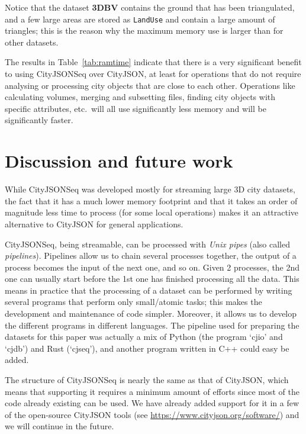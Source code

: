 \documentclass{isprs} %
\begin{document}
Notice that the dataset \textbf{3DBV} contains the ground that has been triangulated, and a few large areas are stored as \texttt{LandUse} and contain a large amount of triangles; this is the reason why the maximum memory use is larger than for other datasets. 

%

The results in Table~\ref{tab:ramtime} indicate that there is a very significant benefit to using CityJSONSeq over CityJSON, at least for operations that do not require analysing or processing city objects that are close to each other.
Operations like calculating volumes, merging and subsetting files, finding city objects with specific attributes, etc.\ will all use significantly less memory and will be significantly faster.


%
\section{Discussion and future work}%
\label{sec:discussion}



While CityJSONSeq was developed mostly for streaming large 3D city datasets, the fact that it has a much lower memory footprint and that it takes an order of magnitude less time to process (for some local operations) makes it an attractive alternative to CityJSON for general applications.

%

CityJSONSeq, being streamable, can be processed with \emph{Unix pipes} (also called \emph{pipelines}).
Pipelines allow us to chain several processes together, the output of a process becomes the input of the next one, and so on. 
Given 2 processes, the 2nd one can usually start before the 1st one has finished processing all the data.
This means in practice that the processing of a dataset can be performed by writing several programs that perform only small/atomic tasks; this makes the development and maintenance of code simpler.
Moreover, it allows us to develop the different programs in different languages. 
The pipeline used for preparing the datasets for this paper was actually a mix of Python (the program `cjio' and `cjdb') and Rust (`cjseq'), and another program written in C++ could easy be added.

%

The structure of CityJSONSeq is nearly the same as that of CityJSON, which means that supporting it requires a minimum amount of efforts since most of the code already existing can be used. 
We have already added support for it in a few of the open-source CityJSON tools (see \url{https://www.cityjson.org/software/}) and we will continue in the future.
\end{document}
